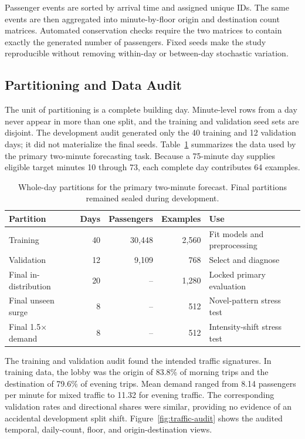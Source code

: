 \documentclass[12pt]{article}
\begin{document}
Passenger events are sorted by arrival time and assigned unique IDs. The same
events are then aggregated into minute-by-floor origin and destination count
matrices. Automated conservation checks require the two matrices to contain
exactly the generated number of passengers. Fixed seeds make the study
reproducible without removing within-day or between-day stochastic variation.

\subsection{Partitioning and Data Audit}

The unit of partitioning is a complete building day. Minute-level rows from a
day never appear in more than one split, and the training and validation seed
sets are disjoint. The development audit generated only the 40 training and
12 validation days; it did not materialize the final seeds. Table~\ref{tab:data-partitions}
summarizes the data used by the primary two-minute forecasting task. Because a
75-minute day supplies eligible target minutes 10 through 73, each complete
day contributes 64 examples.

\begin{table}[H]
  \centering
  \caption{Whole-day partitions for the primary two-minute forecast. Final
  partitions remained sealed during development.}
  \label{tab:data-partitions}
  \begin{tabular}{@{}lrrrl@{}}
    \toprule
    Partition & Days & Passengers & Examples & Use \\
    \midrule
    Training & 40 & 30,448 & 2,560 & Fit models and preprocessing \\
    Validation & 12 & 9,109 & 768 & Select and diagnose \\
    Final in-distribution & 20 & -- & 1,280 & Locked primary evaluation \\
    Final unseen surge & 8 & -- & 512 & Novel-pattern stress test \\
    Final 1.5$\times$ demand & 8 & -- & 512 & Intensity-shift stress test \\
    \bottomrule
  \end{tabular}
\end{table}

The training and validation audit found the intended traffic signatures. In
training data, the lobby was the origin of 83.8\% of morning trips and the
destination of 79.6\% of evening trips. Mean demand ranged from 8.14
passengers per minute for mixed traffic to 11.32 for evening traffic. The
corresponding validation rates and directional shares were similar, providing
no evidence of an accidental development split shift. Figure~\ref{fig:traffic-audit}
shows the audited temporal, daily-count, floor, and origin-destination views.
\end{document}
